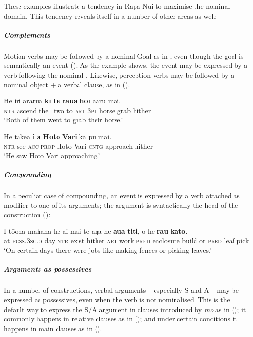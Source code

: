 These examples illustrate a tendency in Rapa Nui to maximise the nominal domain. This tendency reveals itself in a number of other areas as well:

\subparagraph{Complements} Motion verbs may be followed by a nominal Goal  as in , even though the goal is semantically an event (). As the example shows, the event may be expressed by a verb following the nominal . Likewise, perception verbs may be followed by a nominal object + a verbal clause, as in  ().

\ea\label{ex:3.59}
\gll He iri ararua \textbf{ki} \textbf{te} \textbf{rāua} \textbf{hoi} {\ꞌ}a{\ꞌ}aru mai.\\
\textsc{ntr} ascend the\_two to \textsc{art} \textsc{3pl} horse grab hither\\

\glt 
‘Both of them went to grab their horse.’ \textstyleExampleref{[R170.002]} 
\z

\ea\label{ex:3.60}
\gll He take{\ꞌ}a \textbf{i} \textbf{a} \textbf{Hoto} \textbf{Vari} ka pū mai. \\
\textsc{ntr} see \textsc{acc} \textsc{prop} Hoto Vari \textsc{cntg} approach hither \\

\glt
‘He saw Hoto Vari approaching.’ \textstyleExampleref{[R304.004]} 
\z

\subparagraph{Compounding} In a peculiar case of compounding, an event is expressed by a verb attached as modifier to one of its arguments; the argument is syntactically the head of the construction ():

\ea\label{ex:3.61}
\gll {\ꞌ}I tō{\ꞌ}ona mahana he ai mai te aŋa he \textbf{{\ꞌ}āua} \textbf{titi},  {\ꞌ}o he \textbf{rau} \textbf{kato}.\\
at \textsc{poss.3sg.o} day \textsc{ntr} exist hither \textsc{art} work \textsc{pred} enclosure build  or \textsc{pred} leaf pick\\

\glt
‘On certain days there were jobs like making fences or picking leaves.’ \textstyleExampleref{[R380.084]} 
\z

\subparagraph{Arguments as possessives} In a number of constructions, verbal arguments – especially S and A – may be expressed as possessives, even when the verb is not nominalised. This is the default way to express the S/A argument in clauses introduced by \textit{m}\textit{o} as in  (); it commonly happens in relative clauses as in  (); and under certain conditions it happens in main clauses as in  ().

